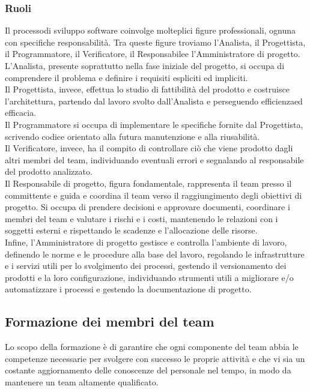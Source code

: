 \subsubsection{Ruoli}
Il processo\glo di sviluppo software coinvolge molteplici figure professionali, ognuna con specifiche responsabilità. Tra queste figure troviamo l'Analista\glo, il Progettista\glo, il Programmatore\glo, il Verificatore\glo, il Responsabile\glo e l'Amministratore di progetto. \\
L'Analista, presente soprattutto nella fase iniziale del progetto, si occupa di comprendere il problema e definire i requisiti espliciti ed impliciti. \\
Il Progettista, invece, effettua lo studio di fattibilità del prodotto e costruisce l'architettura, partendo dal lavoro svolto dall'Analista e perseguendo efficienza\glo ed efficacia\glo. \\
Il Programmatore si occupa di implementare le specifiche fornite dal Progettista, scrivendo codice orientato alla futura manutenzione e alla riusabilità. \\
Il Verificatore\glo, invece, ha il compito di controllare ciò che viene prodotto dagli altri membri del team, individuando eventuali errori e segnalando al responsabile del prodotto analizzato. \\
Il Responsabile di progetto, figura fondamentale, rappresenta il team presso il committente e guida e coordina il team verso il raggiungimento degli obiettivi di progetto. Si occupa di prendere decisioni e approvare documenti, coordinare i membri del team e valutare i rischi e i costi, mantenendo le relazioni con i soggetti esterni e rispettando le scadenze e l'allocazione delle risorse. \\
Infine, l'Amministratore di progetto gestisce e controlla l'ambiente di lavoro, definendo le norme e le procedure alla base del lavoro, regolando le infrastrutture e i servizi utili per lo svolgimento dei processi, gestendo il versionamento dei prodotti e la loro configurazione, individuando strumenti utili a migliorare e/o automatizzare i processi e gestendo la documentazione di progetto. 

\subsection{Formazione dei membri del team}
Lo scopo della formazione è di garantire che ogni componente del team abbia le competenze necessarie per svolgere con successo le proprie attività e che vi sia un costante aggiornamento delle conoscenze del personale nel tempo, in modo da mantenere un team altamente qualificato.

